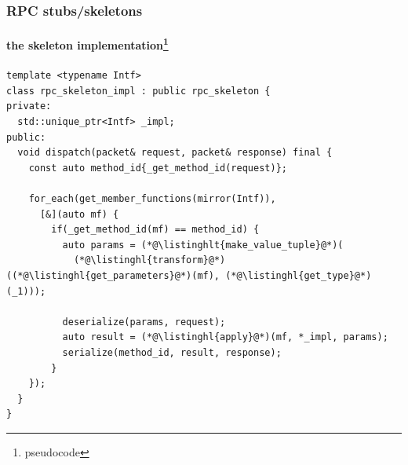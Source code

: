 \documentclass[aspectratio=169,compress,table,xcolor=table]{beamer}
\begin{document}
\begin{frame}[fragile]
  \frametitle{RPC stubs/skeletons}
  \framesubtitle{the skeleton implementation\footnote{pseudocode}}
  \begin{lstlisting}[language=c++2x,basicstyle=\scriptsize\ttfamily]
template <typename Intf>
class rpc_skeleton_impl : public rpc_skeleton {
private:
  std::unique_ptr<Intf> _impl;
public:
  void dispatch(packet& request, packet& response) final {
    const auto method_id{_get_method_id(request)};

    for_each(get_member_functions(mirror(Intf)),
      [&](auto mf) {
        if(_get_method_id(mf) == method_id) {
          auto params = (*@\listinghlt{make_value_tuple}@*)(
            (*@\listinghl{transform}@*)((*@\listinghl{get_parameters}@*)(mf), (*@\listinghl{get_type}@*)(_1)));

          deserialize(params, request);
          auto result = (*@\listinghl{apply}@*)(mf, *_impl, params);
          serialize(method_id, result, response);
        }
    });
  }
}
  \end{lstlisting}
\end{frame}
\end{document}
